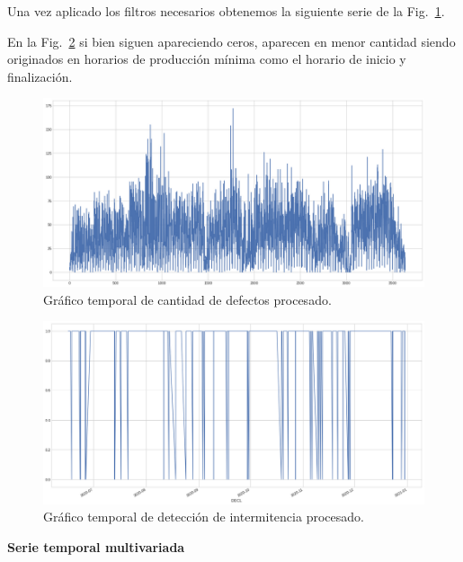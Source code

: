 \documentclass[a4paper,12pt]{article}
\begin{document}
		Una vez aplicado los filtros necesarios obtenemos la siguiente serie de la Fig.~\ref{fig:graf_cantdef_desp}. 
		
		En la Fig.~\ref{fig:graf_inter_desp} si bien siguen apareciendo ceros, aparecen en menor cantidad siendo originados en horarios de producción mínima como el horario de inicio y finalización.
				
		\begin{figure}[]
			\begin{center}
				\includegraphics[width=1\textwidth]{tesis_80.png}
				\caption{Gráfico temporal de cantidad de defectos procesado.}
				\label{fig:graf_cantdef_desp}
			\end{center}
		\end{figure}
				
		\begin{figure}[]
			\begin{center}
				\includegraphics[width=1\textwidth]{tesis_81.png}
				\caption{Gráfico temporal de detección de intermitencia  procesado.}
				\label{fig:graf_inter_desp}
			\end{center}
		\end{figure}
				
		\textbf{Serie temporal multivariada}
				
\end{document}
